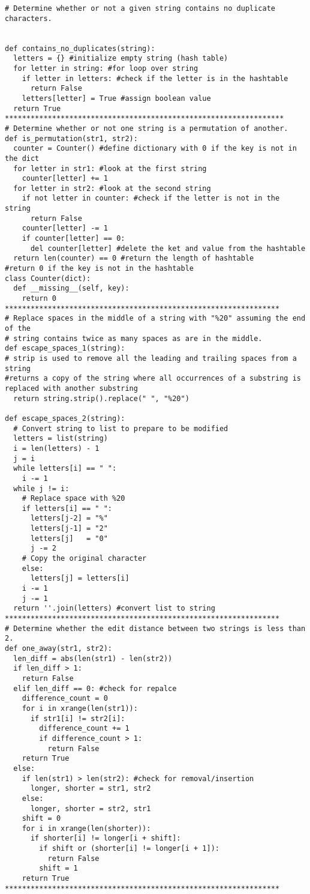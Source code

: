 \documentclass[12pt]{article}
\begin{document}
\begin{lstlisting}
# Determine whether or not a given string contains no duplicate characters.


def contains_no_duplicates(string):
  letters = {} #initialize empty string (hash table)
  for letter in string: #for loop over string
    if letter in letters: #check if the letter is in the hashtable
      return False
    letters[letter] = True #assign boolean value
  return True
*****************************************************************
# Determine whether or not one string is a permutation of another.
def is_permutation(str1, str2):
  counter = Counter() #define dictionary with 0 if the key is not in the dict
  for letter in str1: #look at the first string
    counter[letter] += 1
  for letter in str2: #look at the second string
    if not letter in counter: #check if the letter is not in the string
      return False
    counter[letter] -= 1
    if counter[letter] == 0:
      del counter[letter] #delete the ket and value from the hashtable
  return len(counter) == 0 #return the length of hashtable
#return 0 if the key is not in the hashtable
class Counter(dict):
  def __missing__(self, key):
    return 0
****************************************************************
# Replace spaces in the middle of a string with "%20" assuming the end of the 
# string contains twice as many spaces as are in the middle.
def escape_spaces_1(string):
# strip is used to remove all the leading and trailing spaces from a string
#returns a copy of the string where all occurrences of a substring is replaced with another substring
  return string.strip().replace(" ", "%20")  

def escape_spaces_2(string):
  # Convert string to list to prepare to be modified
  letters = list(string)
  i = len(letters) - 1
  j = i
  while letters[i] == " ":
    i -= 1
  while j != i:
    # Replace space with %20
    if letters[i] == " ":
      letters[j-2] = "%"
      letters[j-1] = "2"
      letters[j]   = "0"
      j -= 2
    # Copy the original character
    else:
      letters[j] = letters[i]
    i -= 1
    j -= 1
  return ''.join(letters) #convert list to string
****************************************************************
# Determine whether the edit distance between two strings is less than 2.
def one_away(str1, str2):
  len_diff = abs(len(str1) - len(str2))
  if len_diff > 1:
    return False
  elif len_diff == 0: #check for repalce
    difference_count = 0
    for i in xrange(len(str1)):
      if str1[i] != str2[i]:
        difference_count += 1
        if difference_count > 1:
          return False
    return True
  else:
    if len(str1) > len(str2): #check for removal/insertion
      longer, shorter = str1, str2
    else:
      longer, shorter = str2, str1
    shift = 0
    for i in xrange(len(shorter)):
      if shorter[i] != longer[i + shift]:
        if shift or (shorter[i] != longer[i + 1]):
          return False
        shift = 1
    return True
****************************************************************
  

\end{lstlisting}
\end{document}
